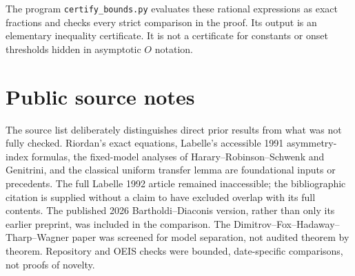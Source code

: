 \documentclass[11pt]{article}
\theoremstyle{definition}
\begin{document}
The program \texttt{certify\_bounds.py} evaluates these rational expressions as exact fractions and checks every strict comparison in the proof. Its output is an elementary inequality certificate. It is not a certificate for constants or onset thresholds hidden in asymptotic $O$ notation.

\section{Public source notes}\label{mct:app:sources}
The source list deliberately distinguishes direct prior results from what was not fully checked. Riordan's exact equations, Labelle's accessible 1991 asymmetry-index formulas, the fixed-model analyses of Harary--Robinson--Schwenk and Genitrini, and the classical uniform transfer lemma are foundational inputs or precedents. The full Labelle 1992 article remained inaccessible; the bibliographic citation is supplied without a claim to have excluded overlap with its full contents. The published 2026 Bartholdi--Diaconis version, rather than only its earlier preprint, was included in the comparison. The Dimitrov--Fox--Hadaway--Tharp--Wagner paper was screened for model separation, not audited theorem by theorem. Repository and OEIS checks were bounded, date-specific comparisons, not proofs of novelty.
\end{document}
